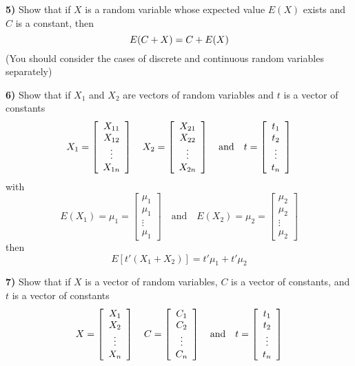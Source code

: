 \documentclass{amsart}
\begin{document}
\par\vspace{1 cm}\noindent
\textbf{5)}  Show that if $X$ is a random variable whose expected value $E(X)$ exists and $C$ is a constant, then
\[
E(C+X) = C+E(X)
\vspace{0.4 cm}
\]
(You should consider the cases of discrete and continuous random variables separately)
\par\vspace{1 cm}\noindent
\textbf{6)}  Show that if $X_1$ and $X_2$ are vectors of random variables and $t$ is a vector of constants
\[
X_1 = \left[\begin{array}{c}X_{11}\\X_{12}\\\vdots\\X_{1n}\end{array}\right]\quad
X_2 = \left[\begin{array}{c}X_{21}\\X_{22}\\\vdots\\X_{2n}\end{array}\right]\quad
\mbox{and}\quad t = \left[\begin{array}{c}t_1\\t_2\\\vdots\\t_n\end{array}\right]
\vspace{0.5 cm}
\]
with
\[
E(X_1) = \mu_1 = \left[\begin{array}{c}\mu_1\\\mu_1\\\vdots\\\mu_1\end{array}\right]\quad\mbox{and}\quad E(X_2) = \mu_2 = \left[\begin{array}{c}\mu_2\\\mu_2\\\vdots\\\mu_2\end{array}\right]
\]
then
\[
E[t'(X_1+X_2)] = t'\mu_1 + t'\mu_2
\]
\par\vspace{1 cm}\noindent
\textbf{7)}  Show that if $X$ is a vector of random variables, $C$ is a vector of constants, and $t$ is a vector of constants
\[
X = \left[\begin{array}{c}X_{1}\\X_{2}\\\vdots\\X_{n}\end{array}\right]\quad
C = \left[\begin{array}{c}C_{1}\\C_{2}\\\vdots\\C_{n}\end{array}\right]\quad
\mbox{and}\quad t = \left[\begin{array}{c}t_1\\t_2\\\vdots\\t_n\end{array}\right]
\vspace{0.5 cm}
\]
\end{document}
